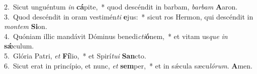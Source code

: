 {2.~}Sicut unguéntum \textit{in} \textbf{cá}pite,~* quod descéndit in barbam, \textit{bar}\textit{bam} \textbf{A}aron.\\
{3.~}Quod descéndit in oram vestimén\textit{ti} \textbf{e}jus:~* sicut ros Hermon, qui descéndit in \textit{mon}\textit{tem} \textbf{Si}on.\\
{4.~}Quóniam illic mandávit Dóminus benedi\textit{cti}\textbf{ó}nem,~* et vitam us\textit{que} \textit{in} \textbf{sǽ}culum.\\
{5.~}Glória Patri, \textit{et} \textbf{Fí}lio,~* et Spirí\textit{tu}\textit{i} \textbf{San}cto.\\
{6.~}Sicut erat in princípio, et nunc, \textit{et} \textbf{sem}per,~* et in sǽcula sæcu\textit{ló}\textit{rum}. \textbf{A}men.\\
